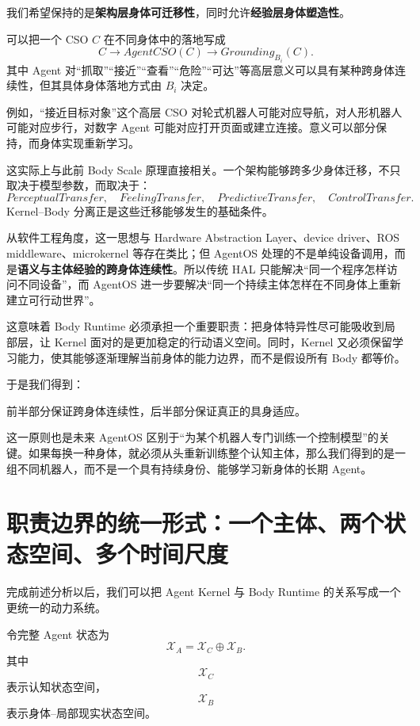 我们希望保持的是\textbf{架构层身体可迁移性}，同时允许\textbf{经验层身体塑造性}。

可以把一个 CSO $C$ 在不同身体中的落地写成
\[
C
\rightarrow
AgentCSO(C)
\rightarrow
Grounding_{B_i}(C).
\]
其中 Agent 对“抓取”“接近”“查看”“危险”“可达”等高层意义可以具有某种跨身体连续性，但其具体身体落地方式由 $B_i$ 决定。

例如，“接近目标对象”这个高层 CSO 对轮式机器人可能对应导航，对人形机器人可能对应步行，对数字 Agent 可能对应打开页面或建立连接。意义可以部分保持，而身体实现重新学习。

这实际上与此前 Body Scale 原理直接相关。一个架构能够跨多少身体迁移，不只取决于模型参数，而取决于：
\[
PerceptualTransfer,
\quad
FeelingTransfer,
\quad
PredictiveTransfer,
\quad
ControlTransfer.
\]
Kernel--Body 分离正是这些迁移能够发生的基础条件。

从软件工程角度，这一思想与 Hardware Abstraction Layer、device driver、ROS middleware、microkernel 等存在类比；但 AgentOS 处理的不是单纯设备调用，而是\textbf{语义与主体经验的跨身体连续性}。所以传统 HAL 只能解决“同一个程序怎样访问不同设备”，而 AgentOS 进一步要解决“同一个持续主体怎样在不同身体上重新建立可行动世界”。

这意味着 Body Runtime 必须承担一个重要职责：把身体特异性尽可能吸收到局部层，让 Kernel 面对的是更加稳定的行动语义空间。同时，Kernel 又必须保留学习能力，使其能够逐渐理解当前身体的能力边界，而不是假设所有 Body 都等价。

于是我们得到：
\begin{statementbox}
\centering
{}
\end{statementbox}

前半部分保证跨身体连续性，后半部分保证真正的具身适应。

这一原则也是未来 AgentOS 区别于“为某个机器人专门训练一个控制模型”的关键。如果每换一种身体，就必须从头重新训练整个认知主体，那么我们得到的是一组不同机器人，而不是一个具有持续身份、能够学习新身体的长期 Agent。

\section{职责边界的统一形式：一个主体、两个状态空间、多个时间尺度}

完成前述分析以后，我们可以把 Agent Kernel 与 Body Runtime 的关系写成一个更统一的动力系统。

令完整 Agent 状态为
\[
\mathcal X_A
=
\mathcal X_C
\oplus
\mathcal X_B.
\]
其中
\[
\mathcal X_C
\]
表示认知状态空间，
\[
\mathcal X_B
\]
表示身体--局部现实状态空间。

